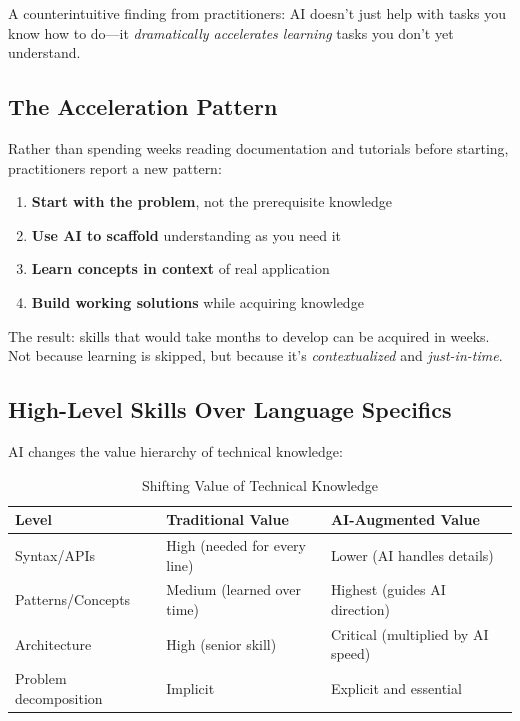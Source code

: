 A counterintuitive finding from practitioners: AI doesn't just help with tasks you know how to do---it \emph{dramatically accelerates learning} tasks you don't yet understand.

\subsection{The Acceleration Pattern}

Rather than spending weeks reading documentation and tutorials before starting, practitioners report a new pattern:

\begin{enumerate}
    \item \textbf{Start with the problem}, not the prerequisite knowledge
    \item \textbf{Use AI to scaffold} understanding as you need it
    \item \textbf{Learn concepts in context} of real application
    \item \textbf{Build working solutions} while acquiring knowledge
\end{enumerate}

The result: skills that would take months to develop can be acquired in weeks. Not because learning is skipped, but because it's \emph{contextualized} and \emph{just-in-time}.

\subsection{High-Level Skills Over Language Specifics}

AI changes the value hierarchy of technical knowledge:

\begin{table}[H]
\centering
\begin{tabular}{lp{5.5cm}p{5.5cm}}
\toprule
\textbf{Level} & \textbf{Traditional Value} & \textbf{AI-Augmented Value} \\
\midrule
Syntax/APIs & High (needed for every line) & Lower (AI handles details) \\
Patterns/Concepts & Medium (learned over time) & Highest (guides AI direction) \\
Architecture & High (senior skill) & Critical (multiplied by AI speed) \\
Problem decomposition & Implicit & Explicit and essential \\
\bottomrule
\end{tabular}
\caption{Shifting Value of Technical Knowledge}
\end{table}

